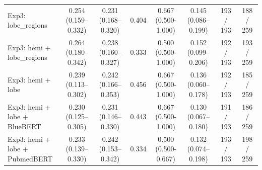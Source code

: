 \documentclass[a4paper,12pt]{article}
\begin{document}
\begin{table}[ht]
\begin{threeparttable}
\begin{tabular}{lccccccc}
Exp3: lobe\_regions &
\makecell{\colorbox{blue!20}{0.254}\\(0.159--0.332)} &
\makecell{0.231\\(0.168--0.320)} &
0.404 &
\makecell{0.667 \\ (0.500-1.000)} &
\makecell{\colorbox{blue!20}{0.145}\\(0.086--0.199)} &
\colorbox{green!20}{193 / 193} & 
\colorbox{orange!20}{188 / 259} \\

Exp3: \makecell{hemi +\\ lobe\_regions} &
\makecell{\colorbox{green!20}{0.264}\\(0.180--0.342)} &
\makecell{0.238\\(0.160--0.327)} &
0.333 &
\makecell{0.500 \\ (0.500-1.000)} &
\makecell{\colorbox{green!20}{0.152}\\(0.099--0.206)} &
\colorbox{blue!20}{192 / 193} & 
\colorbox{blue!20}{193 / 259} \\

Exp3: hemi + lobe &
\makecell{0.239\\(0.113--0.302)} &
\makecell{\colorbox{orange!20}{0.242}\\(0.166--0.353)} &
0.456 &
\makecell{0.667 \\ (0.500-1.000)} &
\makecell{0.136\\(0.060--0.178)} &
\colorbox{blue!20}{192 / 193} &
185 / 259 \\

Exp3: \makecell{hemi + lobe + \\ BlueBERT} &
\makecell{0.230\\(0.125--0.305)} &
\makecell{0.231\\(0.146--0.330)} &
0.443 &
\makecell{0.667 \\ (0.500-1.000)} &
\makecell{0.130\\(0.067--0.180)} &
\colorbox{orange!20}{191 / 193} &
186 / 259 \\

Exp3: \makecell{hemi + lobe + \\ PubmedBERT} &
\makecell{0.233\\(0.139--0.330)} &
\makecell{\colorbox{orange!20}{0.242}\\(0.153--0.342)} &
0.334 &
\makecell{0.500 \\ (0.500-0.667)} &
\makecell{0.132\\(0.074--0.198)} &
\colorbox{green!20}{193 / 193} &
\colorbox{green!20}{198 / 259} \\


\end{tabular}
\end{threeparttable}
\end{table}
\end{document}
